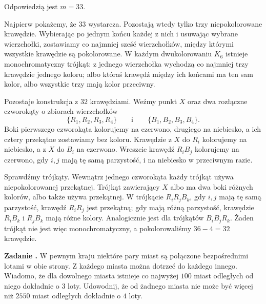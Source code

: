 \documentclass{lecture-kuznia}
\newcounter{zadanie}
\newenvironment{zadanie}[1]{%
	\refstepcounter{zadanie}%
	\par\medskip\noindent
	\textbf{Zadanie \thezadanie.}\quad
}{\par\medskip}
\begin{document}
\begin{solutionbox}
	Odpowiedzią jest $m=33$.

	Najpierw pokażemy, że $33$ wystarcza. Pozostają wtedy tylko trzy
	niepokolorowane krawędzie. Wybierając po jednym końcu każdej z nich i
	usuwając wybrane wierzchołki, zostawiamy co najmniej sześć wierzchołków,
	między którymi wszystkie krawędzie są pokolorowane. W każdym
	dwukolorowaniu $K_6$ istnieje monochromatyczny trójkąt: z jednego
	wierzchołka wychodzą co najmniej trzy krawędzie jednego koloru; albo któraś
	krawędź między ich końcami ma ten sam kolor, albo wszystkie trzy mają kolor
	przeciwny.

	Pozostaje konstrukcja z $32$ krawędziami. Weźmy punkt $X$ oraz dwa
	rozłączne czworokąty o zbiorach wierzchołków
	\[
		\{R_1,R_2,R_3,R_4\}
		\qquad\text{i}\qquad
		\{B_1,B_2,B_3,B_4\}.
	\]
	Boki pierwszego
	czworokąta kolorujemy na czerwono, drugiego na niebiesko, a ich cztery
	przekątne zostawiamy bez koloru. Krawędzie z $X$ do $R_i$ kolorujemy na
	niebiesko, a z $X$ do $B_i$ na czerwono. Wreszcie krawędź $R_iB_j$
	kolorujemy na czerwono, gdy $i,j$ mają tę samą parzystość, i na niebiesko w
	przeciwnym razie.

	Sprawdźmy trójkąty. Wewnątrz jednego czworokąta każdy trójkąt używa
	niepokolorowanej przekątnej. Trójkąt zawierający $X$ albo ma dwa boki
	różnych kolorów, albo także używa przekątnej. W trójkącie $R_iR_jB_k$,
	gdy $i,j$ mają tę samą parzystość, krawędź $R_iR_j$ jest przekątną; gdy
	mają różną parzystość, krawędzie $R_iB_k$ i $R_jB_k$ mają różne kolory.
	Analogicznie jest dla trójkątów $B_iB_jR_k$. Żaden trójkąt nie jest więc
	monochromatyczny, a pokolorowaliśmy $36-4=32$ krawędzie.
\end{solutionbox}

\begin{zadanie}{bardzo trudne} %
W pewnym kraju niektóre pary miast są połączone bezpośrednimi lotami w obie
strony. Z każdego miasta można dotrzeć do każdego innego. Wiadomo, że dla
dowolnego miasta istnieje co najwyżej $100$ miast odległych od niego
dokładnie o $3$ loty. Udowodnij, że od żadnego miasta nie może być więcej
niż $2550$ miast odległych dokładnie o $4$ loty.
\end{zadanie}
\end{document}
